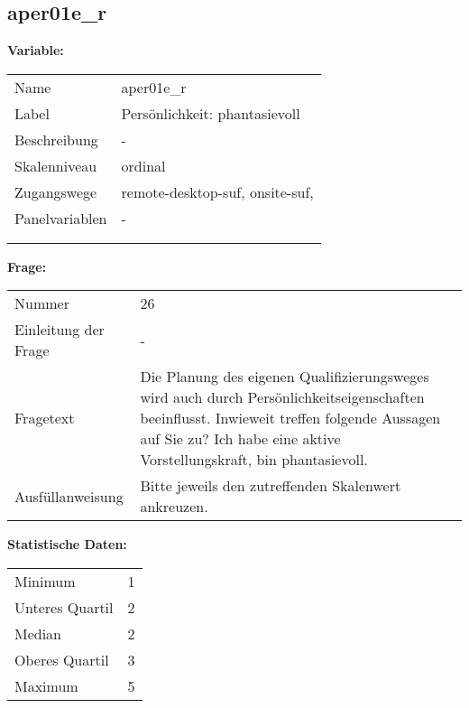 	
	
	\subsection{aper01e\_r}
	\label{subSection:aper01e_r}

	\noindent\textbf{Variable:}\\
		\begin{tabular}{lL{11.3cm}}
			\label{tableVariable:aper01e_r}
			Name & aper01e\_r \\
			Label & Persönlichkeit: phantasievoll \\
			Beschreibung & - \\
			Skalenniveau & ordinal \\
			Zugangswege &
				remote-desktop-suf,
				onsite-suf,
 \\
			Panelvariablen & -
			 \\
			 \\
 \\
		\end{tabular}

		\vspace*{1 cm}
		\noindent\textbf{Frage:}\\
		\begin{tabular}{lL{11.3cm}}
			\label{tableQuestion:aper01e_r}
			Nummer & 26 \\
			Einleitung der Frage & - \\
			Fragetext & Die Planung des eigenen Qualifizierungsweges wird auch durch Persönlichkeitseigenschaften beeinflusst. Inwieweit treffen folgende Aussagen auf Sie zu?
Ich habe eine aktive Vorstellungskraft, bin phantasievoll. \\
			Ausfüllanweisung & Bitte jeweils den zutreffenden
Skalenwert ankreuzen. \\
		\end{tabular}


		\vspace*{1 cm}
		\noindent\textbf{Statistische Daten:}\\
			\begin{tabular}{ll}
				\label{tableStatistics:aper01e_r}
					Minimum & 1 \\
					Unteres Quartil & 2 \\
					Median & 2 \\
					Oberes Quartil & 3 \\
					Maximum & 5 \\
			\end{tabular}



